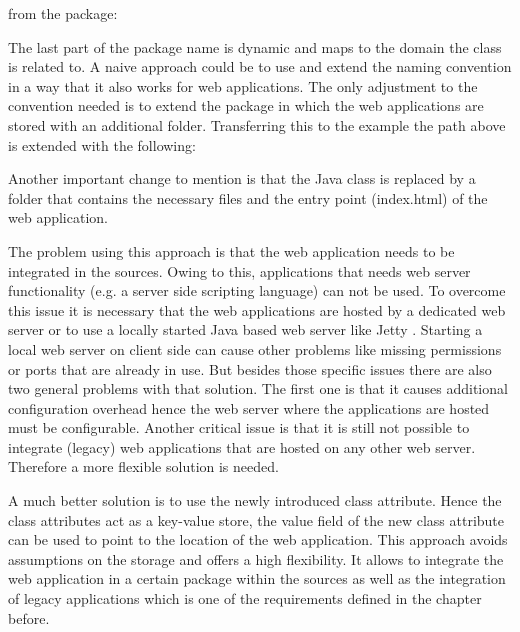 \indent \centerline{}

from the package:  

\indent \centerline{}

The last part of the package name is dynamic and maps to the domain the class is related to. A naive approach could be to use and extend the naming convention in a way that it also works for web applications.
The only adjustment to the convention needed is to extend the package in which the web applications are stored with an additional folder.
Transferring this to the example the path above is extended with the following:

\indent \centerline{}

Another important change to mention is that the Java class is replaced by a folder that contains the necessary files and the entry point (index.html) of the web application.

The problem using this approach is that the web application needs to be integrated in the sources.
Owing to this, applications that needs web server functionality (e.g.
a server side scripting language) can not be used.
To overcome this issue it is necessary that the web applications are hosted by a dedicated web server or to use a locally started Java based web server like Jetty \autocite{conception:jetty}.
Starting a local web server on client side can cause other problems like missing permissions or ports that are already in use.
But besides those specific issues there are also two general problems with that solution.
The first one is that it causes additional configuration overhead hence the web server where the applications are hosted must be configurable.
Another critical issue is that it is still not possible to integrate (legacy) web applications that are hosted on any other web server.
Therefore a more flexible solution is needed.

A much better solution is to use the newly introduced class attribute.
Hence the class attributes act as a key-value store, the value field of the new class attribute can be used to point to the location of the web application.
This approach avoids assumptions on the storage and offers a high flexibility.
It allows to integrate the web application in a certain package within the sources as well as the integration of legacy applications which is one of the requirements defined in the chapter before.

